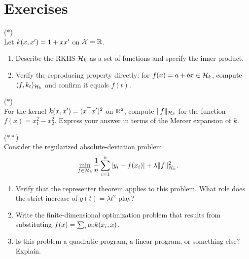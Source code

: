 \documentclass[11pt,a4paper]{article}
\begin{document}

\section{Exercises}
\label{sec:exercises}

\begin{exercise}
\textnormal{(\(*\))} \\
Let $k(x, x') = 1 + x x'$ on $\mathcal{X} = \mathbb{R}$.
\begin{enumerate}[label=(\alph*)]
    \item Describe the RKHS $\mathcal{H}_k$ as a set of functions and
    specify the inner product.
    \item Verify the reproducing property directly: for
    $f(x) = a + bx \in \mathcal{H}_k$, compute $\langle f,
    k_t \rangle_{\mathcal{H}_k}$ and confirm it equals $f(t)$.
\end{enumerate}
\end{exercise}

\begin{exercise}
\textnormal{(\(*\))} \\
For the kernel $k(x, x') = (x^\top x')^2$ on $\mathbb{R}^2$,
compute $\|f\|_{\mathcal{H}_k}$ for the function $f(x) = x_1^2 - x_2^2$.
Express your answer in terms of the Mercer expansion of $k$.
\end{exercise}

\begin{exercise}
\textnormal{(\(**\))} \\
Consider the regularized absolute-deviation problem
\[
\min_{f \in \mathcal{H}_k} \frac{1}{n} \sum_{i=1}^n |y_i - f(x_i)|
+ \lambda \|f\|_{\mathcal{H}_k}^2.
\]
\begin{enumerate}[label=(\alph*)]
    \item Verify that the representer theorem applies to this
    problem. What role does the strict increase of
    $g(t) = \lambda t^2$ play?
    \item Write the finite-dimensional optimization problem that
    results from substituting $f(x) = \sum_i \alpha_i k(x_i, x)$.
    \item Is this problem a quadratic program, a linear program,
    or something else? Explain.
\end{enumerate}
\end{exercise}
\end{document}
